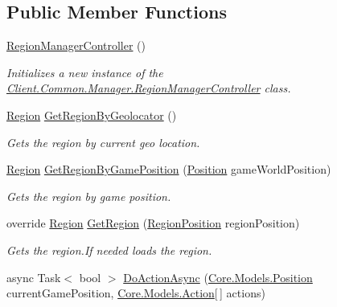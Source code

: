 \subsection*{Public Member Functions}
\begin{DoxyCompactItemize}
\item 
\hyperlink{classClient_1_1Common_1_1Manager_1_1RegionManagerController_a89a6a0097ec0ed4b2e26c2dcf312a27d}{Region\+Manager\+Controller} ()
\begin{DoxyCompactList}\small\item\em Initializes a new instance of the \hyperlink{classClient_1_1Common_1_1Manager_1_1RegionManagerController}{Client.\+Common.\+Manager.\+Region\+Manager\+Controller} class. \end{DoxyCompactList}\item 
\hyperlink{classCore_1_1Models_1_1Region}{Region} \hyperlink{classClient_1_1Common_1_1Manager_1_1RegionManagerController_aec46cc3e22d4ebc001c4e19fc0c0cf48}{Get\+Region\+By\+Geolocator} ()
\begin{DoxyCompactList}\small\item\em Gets the region by current geo location. \end{DoxyCompactList}\item 
\hyperlink{classCore_1_1Models_1_1Region}{Region} \hyperlink{classClient_1_1Common_1_1Manager_1_1RegionManagerController_a449853590dde1fc7fc56388afafd6bf3}{Get\+Region\+By\+Game\+Position} (\hyperlink{classCore_1_1Models_1_1Position}{Position} game\+World\+Position)
\begin{DoxyCompactList}\small\item\em Gets the region by game position. \end{DoxyCompactList}\item 
override \hyperlink{classCore_1_1Models_1_1Region}{Region} \hyperlink{classClient_1_1Common_1_1Manager_1_1RegionManagerController_a63a3b272d688663f463c29d212cdf2e9}{Get\+Region} (\hyperlink{classCore_1_1Models_1_1RegionPosition}{Region\+Position} region\+Position)
\begin{DoxyCompactList}\small\item\em Gets the region.\+If needed loads the region. \end{DoxyCompactList}\item 
async Task$<$ bool $>$ \hyperlink{classClient_1_1Common_1_1Manager_1_1RegionManagerController_a4e248f5877d9aa7b944cff4084ffdc67}{Do\+Action\+Async} (\hyperlink{classCore_1_1Models_1_1Position}{Core.\+Models.\+Position} current\+Game\+Position, \hyperlink{classCore_1_1Models_1_1Action}{Core.\+Models.\+Action}\mbox{[}$\,$\mbox{]} actions)

\end{DoxyCompactItemize}
